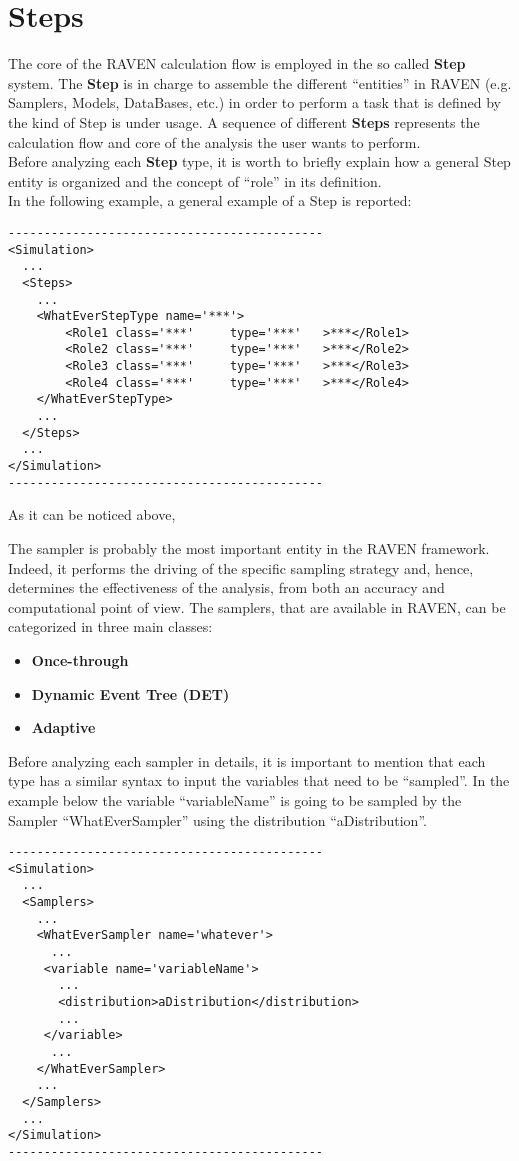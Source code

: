 \section{Steps  \\ \vspace{2 mm} {\small }}
\label{sec:steps}
The core of the RAVEN calculation flow is employed in the so called \textbf{Step} system. The \textbf{Step} is in charge to assemble the different ``entities'' in RAVEN (e.g. Samplers, Models, DataBases, etc.) in order to perform a task that is defined by the kind of Step is under usage. A sequence of different \textbf{Steps} represents the calculation flow and core of the analysis the user wants to perform. 
\\Before analyzing each \textbf{Step} type, it is worth to briefly explain how a general Step entity is organized and the concept of ``role'' in its definition.
\\In the following example, a general example of a Step is reported:
\begin{lstlisting}[style=XML]
--------------------------------------------
<Simulation>
  ...
  <Steps>
    ...
    <WhatEverStepType name='***'>
        <Role1 class='***'     type='***'   >***</Role1>
        <Role2 class='***'     type='***'   >***</Role2>
        <Role3 class='***'     type='***'   >***</Role3>
        <Role4 class='***'     type='***'   >***</Role4>
    </WhatEverStepType>
    ...
  </Steps>
  ...
</Simulation>
--------------------------------------------
\end{lstlisting}
As it can be noticed above,



The sampler is probably the most important entity in the RAVEN framework. Indeed, it performs the driving of the specific sampling strategy and, hence, determines the effectiveness of the analysis, from both an accuracy and computational point of view.  The samplers, that are available in RAVEN, can be categorized in three main classes:
\begin{itemize}
\item \textbf{Once-through}
\item \textbf{Dynamic Event Tree (DET)}
\item \textbf{Adaptive}
\end{itemize}
Before analyzing  each sampler in details, it is important to mention that each type has a similar syntax to input the variables that need to be ``sampled''. In the example below the variable ``variableName'' is going to be sampled by the Sampler ``WhatEverSampler'' using the distribution ``aDistribution''. 
\begin{lstlisting}[style=XML]
--------------------------------------------
<Simulation>
  ...
  <Samplers>
    ...
    <WhatEverSampler name='whatever'>
      ...
     <variable name='variableName'> 
       ...
       <distribution>aDistribution</distribution>
       ...
     </variable>
      ... 
    </WhatEverSampler>
    ...
  </Samplers>
  ...
</Simulation>
--------------------------------------------
\end{lstlisting}

